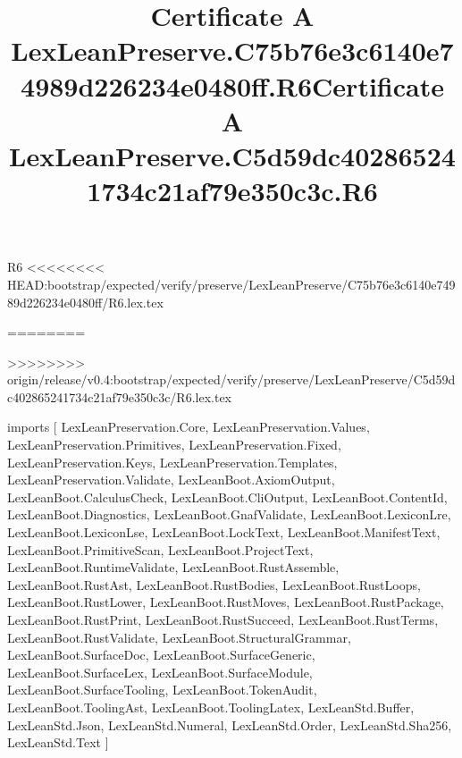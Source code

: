 \begin{lexlean}{R6}
<<<<<<<< HEAD:bootstrap/expected/verify/preserve/LexLeanPreserve/C75b76e3c6140e74989d226234e0480ff/R6.lex.tex
\title{Certificate A LexLeanPreserve.C75b76e3c6140e74989d226234e0480ff.R6}
========
\title{Certificate A LexLeanPreserve.C5d59dc402865241734c21af79e350c3c.R6}
>>>>>>>> origin/release/v0.4:bootstrap/expected/verify/preserve/LexLeanPreserve/C5d59dc402865241734c21af79e350c3c/R6.lex.tex
\begin{coremodule}
imports [
  LexLeanPreservation.Core,
  LexLeanPreservation.Values,
  LexLeanPreservation.Primitives,
  LexLeanPreservation.Fixed,
  LexLeanPreservation.Keys,
  LexLeanPreservation.Templates,
  LexLeanPreservation.Validate,
  LexLeanBoot.AxiomOutput,
  LexLeanBoot.CalculusCheck,
  LexLeanBoot.CliOutput,
  LexLeanBoot.ContentId,
  LexLeanBoot.Diagnostics,
  LexLeanBoot.GnafValidate,
  LexLeanBoot.LexiconLre,
  LexLeanBoot.LexiconLse,
  LexLeanBoot.LockText,
  LexLeanBoot.ManifestText,
  LexLeanBoot.PrimitiveScan,
  LexLeanBoot.ProjectText,
  LexLeanBoot.RuntimeValidate,
  LexLeanBoot.RustAssemble,
  LexLeanBoot.RustAst,
  LexLeanBoot.RustBodies,
  LexLeanBoot.RustLoops,
  LexLeanBoot.RustLower,
  LexLeanBoot.RustMoves,
  LexLeanBoot.RustPackage,
  LexLeanBoot.RustPrint,
  LexLeanBoot.RustSucceed,
  LexLeanBoot.RustTerms,
  LexLeanBoot.RustValidate,
  LexLeanBoot.StructuralGrammar,
  LexLeanBoot.SurfaceDoc,
  LexLeanBoot.SurfaceGeneric,
  LexLeanBoot.SurfaceLex,
  LexLeanBoot.SurfaceModule,
  LexLeanBoot.SurfaceTooling,
  LexLeanBoot.TokenAudit,
  LexLeanBoot.ToolingAst,
  LexLeanBoot.ToolingLatex,
  LexLeanStd.Buffer,
  LexLeanStd.Json,
  LexLeanStd.Numeral,
  LexLeanStd.Order,
  LexLeanStd.Sha256,
  LexLeanStd.Text
]


\end{coremodule}
\end{lexlean}
